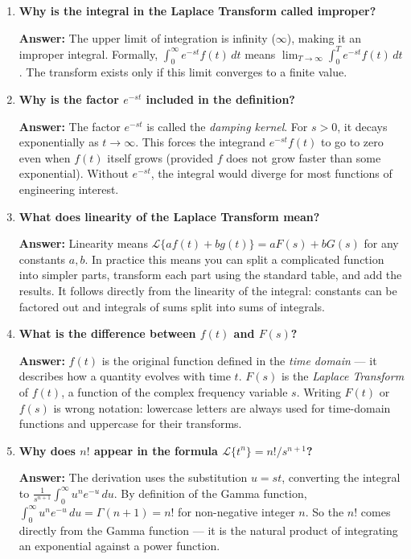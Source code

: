 \documentclass[12pt,a4paper]{article}
\begin{document}
\begin{enumerate}[leftmargin=1.5em, label=\textbf{Q\arabic*.}]

\item \textbf{Why is the integral in the Laplace Transform called improper?}

\textbf{Answer:} The upper limit of integration is infinity ($\infty$), making it an improper integral. Formally, $\int_0^{\infty} e^{-st}f(t)\,dt$ means $\lim_{T\to\infty}\int_0^T e^{-st}f(t)\,dt$. The transform exists only if this limit converges to a finite value.

\item \textbf{Why is the factor $e^{-st}$ included in the definition?}

\textbf{Answer:} The factor $e^{-st}$ is called the \emph{damping kernel}. For $s > 0$, it decays exponentially as $t \to \infty$. This forces the integrand $e^{-st}f(t)$ to go to zero even when $f(t)$ itself grows (provided $f$ does not grow faster than some exponential). Without $e^{-st}$, the integral would diverge for most functions of engineering interest.

\item \textbf{What does linearity of the Laplace Transform mean?}

\textbf{Answer:} Linearity means $\mathcal{L}\{af(t)+bg(t)\} = aF(s) + bG(s)$ for any constants $a, b$. In practice this means you can split a complicated function into simpler parts, transform each part using the standard table, and add the results. It follows directly from the linearity of the integral: constants can be factored out and integrals of sums split into sums of integrals.

\item \textbf{What is the difference between $f(t)$ and $F(s)$?}

\textbf{Answer:} $f(t)$ is the original function defined in the \emph{time domain} --- it describes how a quantity evolves with time $t$. $F(s)$ is the \emph{Laplace Transform} of $f(t)$, a function of the complex frequency variable $s$. Writing $F(t)$ or $f(s)$ is wrong notation: lowercase letters are always used for time-domain functions and uppercase for their transforms.

\item \textbf{Why does $n!$ appear in the formula $\mathcal{L}\{t^n\} = n!/s^{n+1}$?}

\textbf{Answer:} The derivation uses the substitution $u = st$, converting the integral to $\frac{1}{s^{n+1}}\int_0^{\infty}u^n e^{-u}\,du$. By definition of the Gamma function, $\int_0^{\infty}u^n e^{-u}\,du = \Gamma(n+1) = n!$ for non-negative integer $n$. So the $n!$ comes directly from the Gamma function --- it is the natural product of integrating an exponential against a power function.


\end{enumerate}
\end{document}
